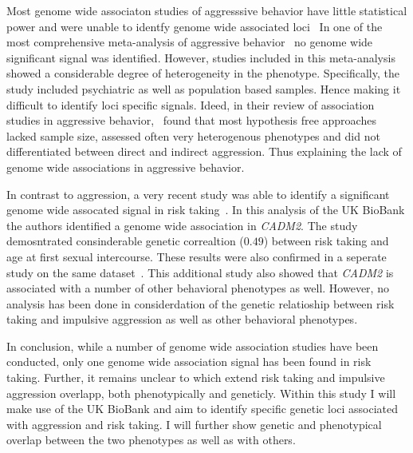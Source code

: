 Most genome wide associaton studies of aggresssive behavior have little statistical power and were unable to identfy genome wide associated loci~\cite{Fernandez-Castillo2016}
In one of the most comprehensive meta-analysis of aggressive behavior~\citet{Vassos2014} no genome wide significant signal was identified.
However, studies included in this meta-analysis showed a considerable degree of heterogeneity in the phenotype.
Specifically, the study included psychiatric as well as population based samples.
Hence making it difficult to identify loci specific signals.
Ideed, in their review of association studies in aggressive behavior,~\citet{Fernandez-Castillo2016} found that most hypothesis free approaches lacked sample size, assessed often very heterogenous phenotypes and did not differentiated between direct and indirect aggression. 
Thus explaining the lack of genome wide associations in aggressive behavior.

In contrast to aggression, a very recent study was able to identify a significant genome wide assocated signal in risk taking~\cite{Day2016}. 
In this analysis of the UK BioBank the authors identified a genome wide association in \textit{CADM2}.
The study demosntrated consinderable genetic correaltion ($0.49$) between risk taking and age at first sexual intercourse.
These results were also confirmed in a seperate study on the same dataset~\cite{Boutwell2017}.
This additional study also showed that \textit{CADM2} is associated with a number of other behavioral phenotypes as well.
However, no analysis has been done in considerdation of the genetic relatioship between risk taking and impulsive aggression as well as other behavioral phenotypes.

In conclusion, while a number of genome wide association studies have been conducted, only one genome wide association signal has been found in risk taking.
Further, it remains unclear to which extend risk taking and impulsive aggression overlapp, both phenotypically and geneticly.
Within this study I will make use of the UK BioBank and aim to identify specific genetic loci associated with aggression and risk taking.
I will further show genetic and phenotypical overlap between the two phenotypes as well as with others.
